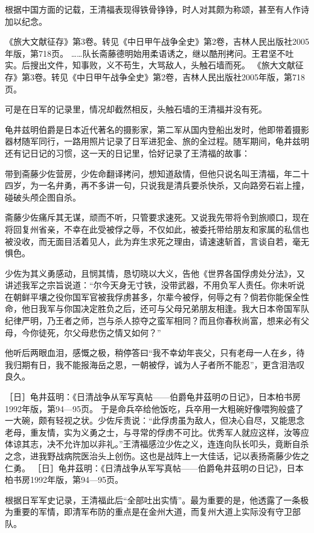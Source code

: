 \documentclass[12pt,UTF8]{ctexbook}
\begin{document}
根据中国方面的记载，王清福表现得铁骨铮铮，时人对其颇为称颂，甚至有人作诗加以纪念。

《旅大文献征存》第3卷。转见《中日甲午战争全史》第2卷，吉林人民出版社2005年版，第718页。
……队长斋藤德明始用柔语诱之，继以酷刑拷问。王君坚不吐实。后搜出文件，知事败，义不苟生，大骂敌人，头触石墙而死。 《旅大文献征存》第3卷。转见《中日甲午战争全史》第2卷，吉林人民出版社2005年版，第718页。

可是在日军的记录里，情况却截然相反，头触石墙的王清福并没有死。

龟井兹明伯爵是日本近代著名的摄影家，第二军从国内登船出发时，他即带着摄影器材随军同行，一路用照片记录了日军进犯金、旅的全过程。随军期间，龟井兹明还有记日记的习惯，这一天的日记里，恰好记录了王清福的故事：

带到斋藤少佐营房，少佐命翻译拷问，想知道敌情，但他只说名叫王清福，年二十四岁，为一名弁勇，再不多讲一句，只说我是清兵要杀快杀，又向路旁石岩上撞，碰破头颅企图自杀。

斋藤少佐痛斥其无谋，顽而不听，只管要求速死。又说我先带将令到旅顺口，现在将回复州省亲，不幸在此受被俘之辱，不仅如此，被委托带给朋友和家属的私信也被没收，而无面目活着见人，此为弃生求死之理由，请速速斩首，言谈自若，毫无惧色。

少佐为其义勇感动，且悯其情，恳切晓以大义，告他《世界各国俘虏处分法》，又讲述我军之宗旨说道：“尔今天身无寸铁，没带武器，不用负军人责任。你未听说在朝鲜平壤之役你国军官被我俘虏甚多，尔辈今被俘，何辱之有？倘若你能保全性命，他日我军与你国决定胜负之后，还可与父母兄弟朋友相逢。我大日本帝国军队纪律严明，乃王者之师，岂与杀人掠夺之蛮军相同？而且你春秋尚富，想来必有父母，今你徒死，尔父母悲伤之情又如何？”

他听后两眼血泪，感慨之极，稍停答曰“我不幸幼年丧父，只有老母一人在乡，待我归期有日，我不能报海岳之恩，一朝被俘，诚为人子者所不能忍”，更含泪浩叹良久。

［日］龟井茲明：《日清战争从军写真帖——伯爵龟井茲明の日记》，日本柏书房1992年版，第94—95页。
于是命兵卒给他饭吃，兵卒用一大粗碗好像喂狗般盛了一大碗，颇有轻视之状。少佐斥责说：“此俘虏虽为敌人，但决心自尽，又能思念老母，重友情，实为义勇之士，与寻常的俘虏不可比。优秀军人就应这样，汝等应体谅其志，决不允许加以非礼。”王清福感泣少佐之义，连连向队长叩头，竟断自杀之念，进我野战病院医治头上创伤。这也是战阵上一大佳话，记以表扬斋藤少佐之仁勇。 ［日］龟井茲明：《日清战争从军写真帖——伯爵龟井茲明の日记》，日本柏书房1992年版，第94—95页。

根据日军军史记录，王清福此后“全部吐出实情”。最为重要的是，他透露了一条极为重要的军情，即清军布防的重点是在金州大道，而复州大道上实际没有守卫部队。
\end{document}
